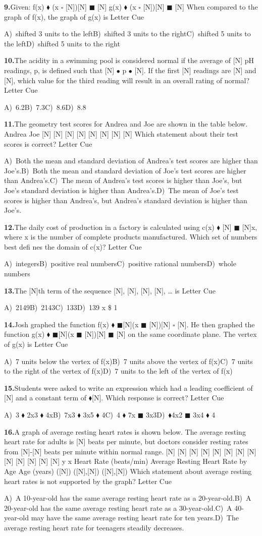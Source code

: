 \documentclass[10pt]{article}
\newcommand{\opA}{\ensuremath{\square}}
\newcommand{\opB}{\ensuremath{\blacksquare}}
\newcommand{\opC}{\ensuremath{\blacklozenge}}
\newcommand{\opD}{\ensuremath{\bullet}}
\newcommand{\Q}[6]{%
  \par\vspace{0.38em}%
  \noindent\textbf{#1.}\enspace #2\hfill
  Letter \underline{\hspace{1.05em}}\enspace Cue \underline{\hspace{1.8em}}\par
  \nobreak
  {\small\noindent A)\ #3\quad B)\ #4\quad C)\ #5\quad D)\ #6\par}%
}
\begin{document}
\Q{9}{Given: f(x) \opC{} (x \opA{} [N])[N] \opB{} [N] g(x) \opC{} (x \opA{} [N])[N] \opB{} [N] When compared to the graph of f(x), the graph of g(x) is}{shifted 3 units to the left}{shifted 3 units to the right}{shifted 5 units to the left}{shifted 5 units to the right}
\Q{10}{The acidity in a swimming pool is considered normal if the average of [N] pH readings, p, is defined such that [N] \opD{} p \opD{} [N]. If the first [N] readings are [N] and [N], which value for the third reading will result in an overall rating of normal?}{6.2}{7.3}{8.6}{8.8}
\Q{11}{The geometry test scores for Andrea and Joe are shown in the table below. Andrea Joe [N] [N] [N] [N] [N] [N] [N] [N] Which statement about their test scores is correct?}{Both the mean and standard deviation of Andrea's test scores are higher than Joe's.}{Both the mean and standard deviation of Joe's test scores are higher than Andrea's.}{The mean of Andrea's test scores is higher than Joe's, but Joe's standard deviation is higher than Andrea's.}{The mean of Joe's test scores is higher than Andrea's, but Andrea's standard deviation is higher than Joe's.}
\Q{12}{The daily cost of production in a factory is calculated using c(x) \opC{} [N] \opB{} [N]x, where x is the number of complete products manufactured. Which set of numbers best defi nes the domain of c(x)?}{integers}{positive real numbers}{positive rational numbers}{whole numbers}
\Q{13}{The [N]th term of the sequence [N], [N], [N], [N], \ldots{} is}{2149}{2143}{133}{139 x \$ 1}
\Q{14}{Josh graphed the function f(x) \opC{} \opB{}[N](x \opB{} [N])[N] \opA{} [N]. He then graphed the function g(x) \opC{} \opB{}[N](x \opB{} [N])[N] \opB{} [N] on the same coordinate plane. The vertex of g(x) is}{7 units below the vertex of f(x)}{7 units above the vertex of f(x)}{7 units to the right of the vertex of f(x)}{7 units to the left of the vertex of f(x)}
\Q{15}{Students were asked to write an expression which had a leading coefficient of [N] and a constant term of \opC{}[N]. Which response is correct?}{3 \opC{} 2x3 \opC{} 4x}{7x3 \opC{} 3x5 \opC{} 4}{4 \opC{} 7x \opB{} 3x3}{\opC{}4x2 \opB{} 3x4 \opC{} 4}
\Q{16}{A graph of average resting heart rates is shown below. The average resting heart rate for adults is [N] beats per minute, but doctors consider resting rates from [N]-[N] beats per minute within normal range. [N] [N] [N] [N] [N] [N] [N] [N] [N] [N] [N] [N] [N] y x Heart Rate (beats/min) Average Resting Heart Rate by Age Age (years) ([N]) ([N],[N]) ([N],[N]) Which statement about average resting heart rates is not supported by the graph?}{A 10-year-old has the same average resting heart rate as a 20-year-old.}{A 20-year-old has the same average resting heart rate as a 30-year-old.}{A 40-year-old may have the same average resting heart rate for ten years.}{The average resting heart rate for teenagers steadily decreases.}
\end{document}
